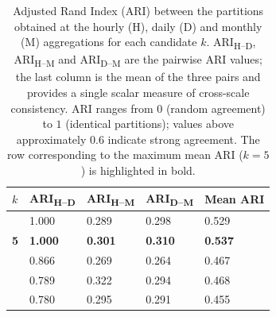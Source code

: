 \renewcommand{\arraystretch}{1.25}
\setlength{\tabcolsep}{6pt}
\begin{table}[h]
\centering
{}
\begin{tabularx}{\textwidth}{>{\centering\arraybackslash}m{0.8cm} Y Y Y Y}
\hline
\textbf{$k$} & \textbf{ARI}\textsubscript{H--D} & \textbf{ARI}\textsubscript{H--M} & \textbf{ARI}\textsubscript{D--M} & \textbf{Mean ARI} \\
 & 1.000 & 0.289 & 0.298 & 0.529 \\
\hline
\textbf{5} & \textbf{1.000} & \textbf{0.301} & \textbf{0.310} & \textbf{0.537} \\
 & 0.866 & 0.269 & 0.264 & 0.467 \\
 & 0.789 & 0.322 & 0.294 & 0.468 \\
 & 0.780 & 0.295 & 0.291 & 0.455 \\
\hline
\end{tabularx}
\caption{Adjusted Rand Index (ARI) between the partitions obtained at the hourly (H), daily (D) and monthly (M) aggregations for each candidate $k$. ARI\textsubscript{H--D}, ARI\textsubscript{H--M} and ARI\textsubscript{D--M} are the pairwise ARI values; the last column is the mean of the three pairs and provides a single scalar measure of cross-scale consistency. ARI ranges from $0$ (random agreement) to $1$ (identical partitions); values above approximately $0.6$ indicate strong agreement. The row corresponding to the maximum mean ARI ($k=5$) is highlighted in bold.}
\label{tab:ari_summary}
\end{table}
